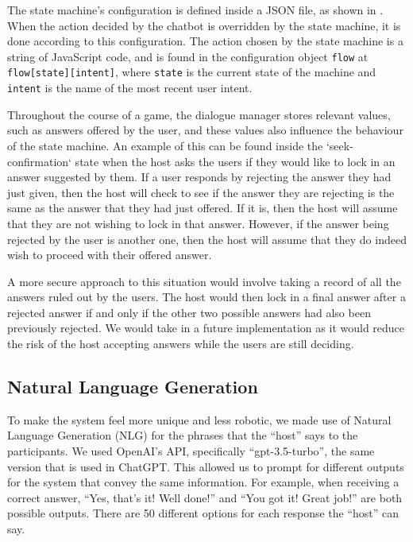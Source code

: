 \documentclass[hidelinks, 11pt]{article}
\begin{document}
The state machine's configuration is defined inside a JSON file, as shown in . When the action decided by the chatbot is overridden by the state machine, it is done according to this configuration. The action chosen by the state machine is a string of JavaScript code, and is found in the configuration object \verb|flow| at \verb|flow[state][intent]|, where \verb|state| is the current state of the machine and \verb|intent| is the name of the most recent user intent.

Throughout the course of a game, the dialogue manager stores relevant values, such as answers offered by the user, and these values also influence the behaviour of the state machine. An example of this can be found inside the `seek-confirmation` state when the host asks the users if they would like to lock in an answer suggested by them. If a user responds by rejecting the answer they had just given, then the host will check to see if the answer they are rejecting is the same as the answer that they had just offered. If it is, then the host will assume that they are not wishing to lock in that answer. However, if the answer being rejected by the user is another one, then the host will assume that they do indeed wish to proceed with their offered answer.

A more secure approach to this situation would involve taking a record of all the answers ruled out by the users. The host would then lock in a final answer after a rejected answer if and only if the other two possible answers had also been previously rejected. We would take in a future implementation as it would reduce the risk of the host accepting answers while the users are still deciding.

\subsection{Natural Language Generation}
\label{subsec:nlg}

To make the system feel more unique and less robotic, we made use of Natural Language Generation (NLG) for the phrases that the “host” says to the participants. We used OpenAI's API, specifically “gpt-3.5-turbo”, the same version that is used in ChatGPT. This allowed us to prompt for different outputs for the system that convey the same information. For example, when receiving a correct answer, “Yes, that's it! Well done!” and “You got it! Great job!” are both possible outputs. There are 50 different options for each response the “host” can say.
\end{document}
